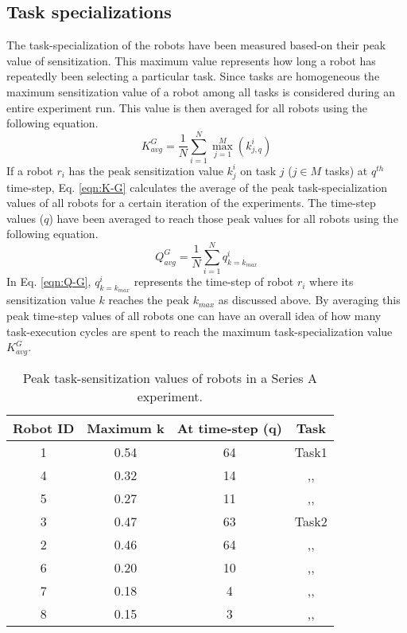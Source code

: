 \subsection*{Task specializations}
The task-specialization of the robots have been measured based-on their peak value of sensitization. This maximum value represents how long a robot has repeatedly been selecting a particular task. Since tasks are homogeneous  the maximum sensitization value of a robot among all tasks is considered during an entire experiment run. This value is then averaged for all robots using the following  equation. 
\begin{equation}
K^G_{avg} = \frac{1}{N}\sum_{i=1}^{N} \max_{j=1}^M\left ( k^i_{j, q} \right ) 
\label{eqn:K-G}
\end{equation}
If a robot $r_i$ has the peak sensitization value $k^i_j$ on task $j$ ($j \in M$ tasks)  at $q^{th}$ time-step, Eq. \ref{eqn:K-G} calculates the average of the peak task-specialization values of all robots for a certain iteration of the experiments.  The time-step values ($q$)  have been averaged to reach those peak values for all robots using the following equation.
\begin{equation}
Q^G_{avg}= \frac{1}{N}\sum_{i=1}^{N} q^i_{k=k_{max}}
\label{eqn:Q-G}
\end{equation}
In Eq. \ref{eqn:Q-G}, $q^i_{k=k_{max}}$ represents the time-step of robot $r_i$  where its sensitization value $k$ reaches the peak $k_{max}$ as discussed above. By averaging this peak time-step values of all robots one can have an overall idea of how many task-execution cycles are spent to reach the maximum task-specialization value $K^G_{avg}$.
\begin{table}[H]
\centering
\caption{Peak task-sensitization values of robots in a Series A experiment.}
\begin{tabular}{|c|c|c|c|}
\hline \textbf{Robot ID} & \textbf{Maximum k} & \textbf{At time-step (q)} & \textbf{Task} \\ 
\hline 1 & 0.54 & 64 & Task1\\
\hline 4 & 0.32 & 14 & ,,\\
\hline 5 & 0.27 & 11 & ,,\\
\hline 3 & 0.47 & 63 & Task2\\
\hline 2 & 0.46 & 64 & ,,\\
\hline 6 & 0.20 & 10 & ,,\\
\hline 7 & 0.18 & 4 & ,,\\
\hline 8 & 0.15 & 3 & ,,\\
\hline 
\end{tabular} 
\label{table:K-G-SA}
\end{table}
